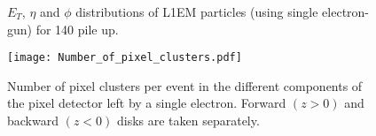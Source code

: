 \documentclass[a4paper,12pt,oneside]{article}
\begin{document}
        \begin{figure}[!htb]
          \centering
          \caption{$E_{T}$, $\eta$ and $\phi$ distributions of L1EM particles (using single electron-gun) for 140 pile up.}
          \label{}
        \end{figure}

        \begin{figure}[!htb]
          \centering
          \texttt{[image: Number\_of\_pixel\_clusters.pdf]}
          \caption{Number of pixel clusters per event in the different components of the pixel detector left by a single electron.
            Forward $(z>0)$ and backward $(z<0)$ disks are taken separately.}
          \label{}
        \end{figure}


{}

\end{document}
